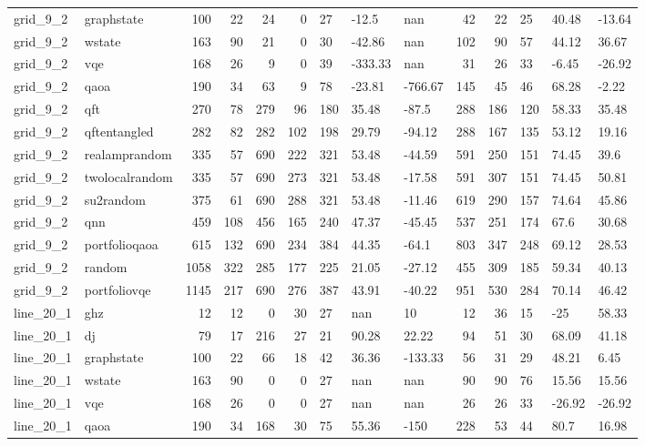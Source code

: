 \begin{longtable}{llrrrrlllrrlll}
grid\_9\_2 & graphstate & 100 & 22 & 24 & 0 & 27 & -12.5 & nan & 42 & 22 & 25 & 40.48 & -13.64 \\
grid\_9\_2 & wstate & 163 & 90 & 21 & 0 & 30 & -42.86 & nan & 102 & 90 & 57 & 44.12 & 36.67 \\
grid\_9\_2 & vqe & 168 & 26 & 9 & 0 & 39 & -333.33 & nan & 31 & 26 & 33 & -6.45 & -26.92 \\
grid\_9\_2 & qaoa & 190 & 34 & 63 & 9 & 78 & -23.81 & -766.67 & 145 & 45 & 46 & 68.28 & -2.22 \\
grid\_9\_2 & qft & 270 & 78 & 279 & 96 & 180 & 35.48 & -87.5 & 288 & 186 & 120 & 58.33 & 35.48 \\
grid\_9\_2 & qftentangled & 282 & 82 & 282 & 102 & 198 & 29.79 & -94.12 & 288 & 167 & 135 & 53.12 & 19.16 \\
grid\_9\_2 & realamprandom & 335 & 57 & 690 & 222 & 321 & 53.48 & -44.59 & 591 & 250 & 151 & 74.45 & 39.6 \\
grid\_9\_2 & twolocalrandom & 335 & 57 & 690 & 273 & 321 & 53.48 & -17.58 & 591 & 307 & 151 & 74.45 & 50.81 \\
grid\_9\_2 & su2random & 375 & 61 & 690 & 288 & 321 & 53.48 & -11.46 & 619 & 290 & 157 & 74.64 & 45.86 \\
grid\_9\_2 & qnn & 459 & 108 & 456 & 165 & 240 & 47.37 & -45.45 & 537 & 251 & 174 & 67.6 & 30.68 \\
grid\_9\_2 & portfolioqaoa & 615 & 132 & 690 & 234 & 384 & 44.35 & -64.1 & 803 & 347 & 248 & 69.12 & 28.53 \\
grid\_9\_2 & random & 1058 & 322 & 285 & 177 & 225 & 21.05 & -27.12 & 455 & 309 & 185 & 59.34 & 40.13 \\
grid\_9\_2 & portfoliovqe & 1145 & 217 & 690 & 276 & 387 & 43.91 & -40.22 & 951 & 530 & 284 & 70.14 & 46.42 \\
line\_20\_1 & ghz & 12 & 12 & 0 & 30 & 27 & nan & 10 & 12 & 36 & 15 & -25 & 58.33 \\
line\_20\_1 & dj & 79 & 17 & 216 & 27 & 21 & 90.28 & 22.22 & 94 & 51 & 30 & 68.09 & 41.18 \\
line\_20\_1 & graphstate & 100 & 22 & 66 & 18 & 42 & 36.36 & -133.33 & 56 & 31 & 29 & 48.21 & 6.45 \\
line\_20\_1 & wstate & 163 & 90 & 0 & 0 & 27 & nan & nan & 90 & 90 & 76 & 15.56 & 15.56 \\
line\_20\_1 & vqe & 168 & 26 & 0 & 0 & 27 & nan & nan & 26 & 26 & 33 & -26.92 & -26.92 \\
line\_20\_1 & qaoa & 190 & 34 & 168 & 30 & 75 & 55.36 & -150 & 228 & 53 & 44 & 80.7 & 16.98 \\

\end{longtable}
